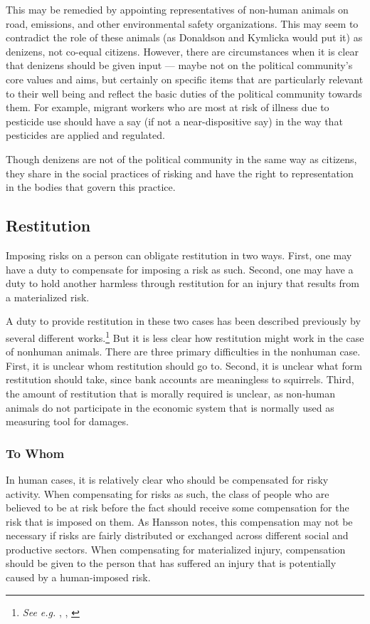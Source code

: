 This may be remedied by appointing representatives of non-human animals on
road, emissions, and other environmental safety organizations. This may seem to
contradict the role of these animals (as Donaldson and Kymlicka would put it)
as denizens, not co-equal citizens. However, there are circumstances when it is
clear that denizens should be given input --- maybe not on the political
community’s core values and aims, but certainly on specific items that are
particularly relevant to their well being and reflect the basic duties of the
political community towards them. For example, migrant workers who are most at
risk of illness due to pesticide use should have a say (if not a
near-dispositive say) in the way that pesticides are applied and regulated.

Though denizens are not of the political community in the same way as citizens,
they share in the social practices of risking and have the right to
representation in the bodies that govern this practice.

\subsection{Restitution}

Imposing risks on a person can obligate restitution in two ways. First, one may
have a duty to compensate for imposing a risk as such. Second, one may have a
duty to hold another harmless through restitution for an injury that results
from a materialized risk.

A duty to provide restitution in these two cases has been described previously
by several different works.\footnote{\emph{See e.g.} \cite{hansson_risk},
\cite{frowe}, \cite{finkelstein}} But it is less clear how restitution might
work in the case of nonhuman animals. There are three primary difficulties in the
nonhuman case.  First, it is unclear whom restitution should go to. Second, it
is unclear what form restitution should take, since bank accounts are
meaningless to squirrels. Third, the amount of restitution that is morally
required is unclear, as non-human animals do not participate in the economic
system that is normally used as measuring tool for damages.

\subsubsection{To Whom}

In human cases, it is relatively clear who should be compensated for risky
activity. When compensating for risks as such, the class of people who are
believed to be at risk before the fact should receive some compensation for the
risk that is imposed on them. As Hansson notes, this compensation may not be
necessary if risks are fairly distributed or exchanged across different social
and productive sectors.\autocite[103]{hansson_risk} When compensating for
materialized injury, compensation should be given to the person that has
suffered an injury that is potentially caused by a human-imposed
risk.\autocite[112--113]{hansson_risk}


